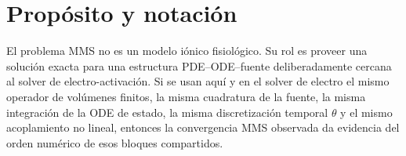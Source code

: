 \documentclass[11pt,a4paper]{article}
\newcommand{\Mmass}{\mathbf{M}}
\newcommand{\Kstif}{\mathbf{K}}
\begin{document}
\begin{abstract}
 Los ensamblajes de
matriz dispersa de $\Mmass$ y $\Kstif$ se dividen en \emph{chunks} sobre celdas/caras para
acotar el pico transitorio del vector de triplets en mallas 3D no estructuradas grandes. La
implementación actual expone además un modo automático de optimización de memoria con
reserva adaptativa de triplets de rigidez, ensamblaje compacto de masa consistente,
asignación condicional de campos en los puntos de cuadratura iónicos, y recorte del
asignador alrededor de las fases grandes de setup. La sección de resultados es guiada por
datos: las tablas se generan a partir de las salidas actuales del tutorial y se ajustan
directamente desde los archivos agregados .
\end{abstract}

\tableofcontents
\bigskip

\section{Propósito y notación}

El problema MMS no es un modelo iónico fisiológico. Su rol es proveer una solución exacta
para una estructura PDE--ODE--fuente deliberadamente cercana al solver de
electro-activación. Si se usan aquí y en el solver de electro el mismo operador de
volúmenes finitos, la misma cuadratura de la fuente, la misma integración de la ODE de
estado, la misma discretización temporal $\theta$ y el mismo acoplamiento no lineal,
entonces la convergencia MMS observada da evidencia del orden numérico de esos bloques
compartidos.
\end{document}

